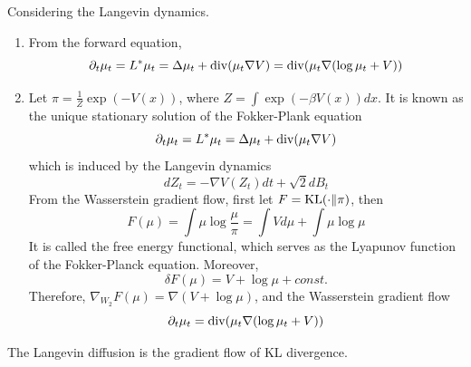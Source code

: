 \documentclass[a4paper,12pt]{article}
\begin{document}
\begin{exam}
  Considering the Langevin dynamics.
  \begin{enumerate}[label=(\arabic{*})]
    \item From the forward equation,
    \begin{equation*}
      \partial_t \mu_t = L^* \mu_t = \Delta \mu_t + \operatorname{div}(\mu_t\nabla V) = \operatorname{div} (\mu_t\nabla (\log \mu_t + V))
    \end{equation*}

    \item Let $\pi = \frac{1}{Z}\exp(-V(x))$, where $Z = \int \exp(-\beta V(x)) dx$. It is known as the unique stationary solution of the Fokker-Plank equation
    \begin{equation*}
      \partial_t \mu_t = L^* \mu_t = \Delta \mu_t + \operatorname{div}(\mu_t\nabla V)
    \end{equation*}
    which is induced by the Langevin dynamics
    \begin{equation*}
      dZ_t = -\nabla V(Z_t)dt + \sqrt{2}dB_t
    \end{equation*}
    From the Wasserstein gradient flow, first let $F = \operatorname{KL}(\cdot \Vert \pi)$, then
    \begin{equation*}
      F(\mu) = \int \mu \log \frac{\mu}{\pi} = \int V d\mu + \int \mu \log \mu
    \end{equation*}
    It is called the free energy functional, which serves as the Lyapunov function of the Fokker-Planck equation. Moreover,
    \begin{equation*}
      \delta F(\mu) = V + \log \mu + const.
    \end{equation*}
    Therefore, $\nabla_{W_2} F(\mu) = \nabla (V + \log \mu)$, and the Wasserstein gradient flow
    \begin{equation*}
      \partial_t \mu_t = \operatorname{div} (\mu_t\nabla (\log \mu_t + V))
    \end{equation*}
  \end{enumerate}
  The Langevin diffusion is the gradient flow of KL divergence.
\end{exam}
\end{document}
